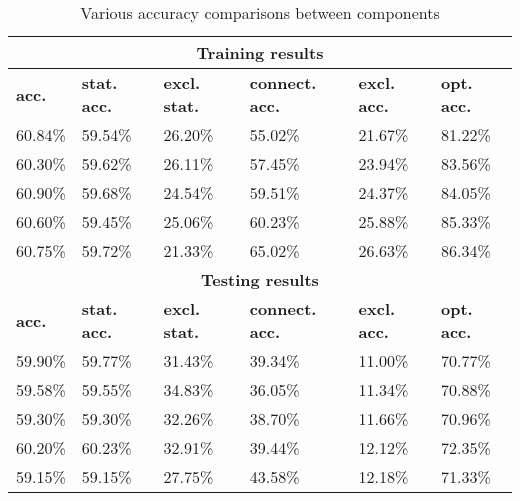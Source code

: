 \begin{table}[htp]
    \centering 
	\begin{tabular}{|l|l|l|l|l|l|}
		\hline
		\multicolumn{6}{|c|}{\bf Training results } \\ \hline
		{\bf acc.} & {\bf stat. acc.} & {\bf excl. stat.}& {\bf connect. acc. } & {\bf excl. acc. } & {\bf opt. acc.} \\ \hline
		60.84\%	   &  59.54\%    & 26.20\%   &  55.02\%  & 21.67\%   & 81.22\% \\ \hline
		60.30\%    &  59.62\%    & 26.11\%   &  57.45\%  & 23.94\%   & 83.56\% \\ \hline
		60.90\%    &  59.68\%    & 24.54\%   &  59.51\%  & 24.37\%   & 84.05\% \\ \hline
		60.60\%    &  59.45\%    & 25.06\%   &  60.23\%  & 25.88\%   & 85.33\% \\ \hline
		60.75\%    &  59.72\%    & 21.33\%   &  65.02\%  & 26.63\%   & 86.34\% \\ \hline
		\multicolumn{6}{|c|}{\bf Testing results } \\ \hline
		{\bf acc.} & {\bf stat. acc.} & {\bf excl. stat.} & {\bf connect. acc. } & {\bf excl. acc. } & {\bf opt. acc.} \\ \hline
		59.90\%    &  59.77\%   & 31.43\%   &  39.34\%   & 11.00\%   & 70.77\% \\ \hline
		59.58\%    &  59.55\%   & 34.83\%   &  36.05\%   & 11.34\%   & 70.88\% \\ \hline
		59.30\%    &  59.30\%   & 32.26\%   &  38.70\%   & 11.66\%   & 70.96\% \\ \hline
		60.20\%    &  60.23\%   & 32.91\%   &  39.44\%   & 12.12\%   & 72.35\% \\ \hline
		59.15\%    &  59.15\%   & 27.75\%   &  43.58\%   & 12.18\%   & 71.33\% \\ \hline
	\end{tabular}
	\caption{Various accuracy comparisons between components \label{table:ALLACCURACY}}
\end{table}

